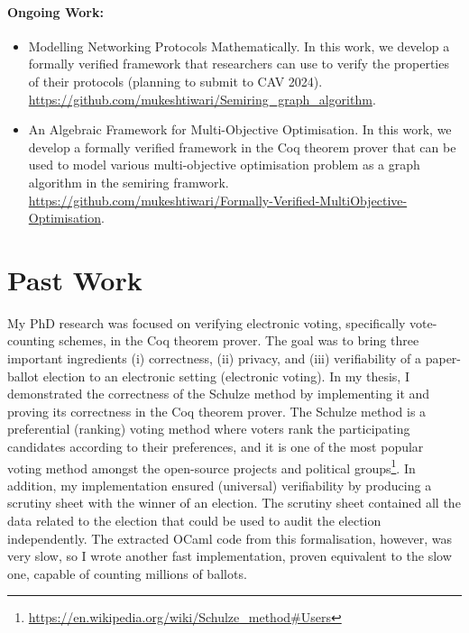 \documentclass[a4paper]{article}
\begin{document}
\begin{itemize}
 
\paragraph{Ongoing Work:} 
\begin{itemize}
\item Modelling Networking Protocols Mathematically. In this work, we develop 
a formally verified framework that researchers can use to verify 
the properties of their protocols (planning to submit to CAV 2024).
\url{https://github.com/mukeshtiwari/Semiring_graph_algorithm}. 


\item {An Algebraic Framework for Multi-Objective Optimisation. In this work, we develop 
a formally verified framework in the Coq theorem prover that can be used to model 
various multi-objective 
optimisation problem as a graph algorithm in the semiring framwork.
\url{https://github.com/mukeshtiwari/Formally-Verified-MultiObjective-Optimisation}}.
\end{itemize}	
\end{itemize}

\section{Past Work}
My PhD research was focused on verifying electronic voting, specifically vote-counting schemes, in 
the Coq theorem prover. The goal was to 
bring  three important ingredients (i) correctness, (ii) privacy, and (iii) verifiability of a 
paper-ballot election to 
an electronic setting (electronic voting).
In my thesis, I demonstrated the correctness of the Schulze method 
by implementing it and proving its correctness in the Coq theorem 
prover. The Schulze method is a preferential (ranking) voting method where voters rank the participating 
candidates according to their preferences, and it is one of the most popular voting method 
amongst the open-source projects and 
political groups\footnote{\url{https://en.wikipedia.org/wiki/Schulze_method#Users}}.
In addition, my implementation 
ensured (universal) verifiability by producing a scrutiny sheet 
with the winner of an election. The scrutiny sheet contained all the data related 
to the election that could be used to audit the election independently. 
The extracted OCaml code from this formalisation, however, was 
very slow, so I wrote another fast implementation, proven equivalent to the slow one,
capable of counting millions of ballots.
\end{document}
